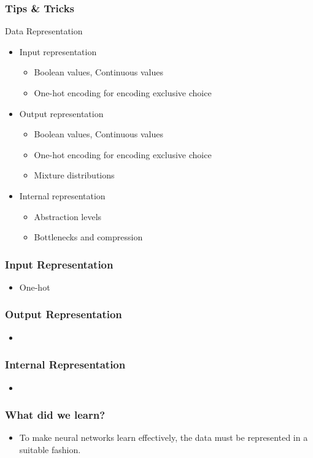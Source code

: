 \documentclass[8pt]{beamer}
\begin{document}
\begin{frame}
\frametitle{Tips \& Tricks}
 \begin{block}{Data Representation}
  \begin{itemize}
   \item Input representation
   \begin{itemize}
    \item Boolean values, Continuous values
    \item One-hot encoding for encoding exclusive choice
   \end{itemize}
   \item Output representation
   \begin{itemize}
    \item Boolean values, Continuous values
    \item One-hot encoding for encoding exclusive choice
    \item Mixture distributions
   \end{itemize}
   \item Internal representation
   \begin{itemize}
    \item Abstraction levels
    \item Bottlenecks and compression
   \end{itemize}
  \end{itemize}
 \end{block}
\end{frame}

\begin{frame}
\frametitle{Input Representation}
 \begin{itemize}
  \item One-hot 
 \end{itemize}
\end{frame}

\begin{frame}
\frametitle{Output Representation}
 \begin{itemize}
  \item 
 \end{itemize}
\end{frame}

\begin{frame}
\frametitle{Internal Representation}
 \begin{itemize}
  \item 
 \end{itemize}
\end{frame}

\begin{frame}
\frametitle{What did we learn?}
 \begin{itemize}
  \item To make neural networks learn effectively, the data must be represented in a suitable fashion.
 \end{itemize}
\end{frame}
\end{document}
